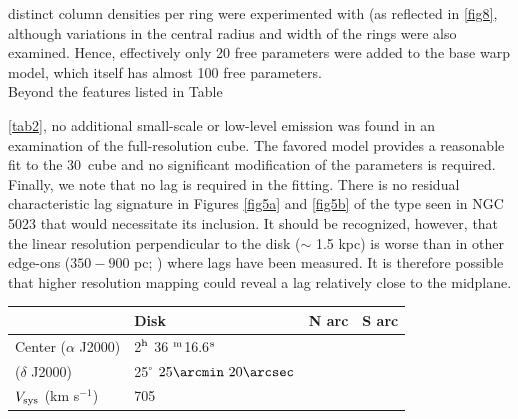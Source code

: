 \documentclass[useAMS,usenatbib]{mn2e}
\begin{document}
distinct column densities per ring were experimented with (as reflected in
\ref{fig8}, although variations in the central radius and width of the rings were also examined.  Hence, effectively only 20 free parameters were added to the base warp model, which itself has almost 100 free parameters.\\
\indent Beyond the features listed in Table {\ref{tab2}, no additional small-scale or low-level emission was found in an
examination of the full-resolution cube.  The favored model provides a
reasonable fit to the 30\arcsec\ cube and no significant modification of the
parameters is required.\\
\indent Finally, we note that no lag is required in the fitting.  There
is no residual characteristic lag signature in Figures \ref{fig5a} and 
\ref{fig5b} of the type seen in NGC 5023 that would necessitate its inclusion.
It should be recognized, however, that the linear resolution perpendicular to the disk ($\sim$ 1.5 kpc) is worse than in other edge-ons ($350-900$ pc; \citet{Oosterloo2007,Kamphuis2011,Zschaechner2011,Zschaechner2012}) where lags have been measured.  It is therefore possible that higher resolution mapping could reveal a lag relatively close to the midplane.\\
 \begin{table}
    \centering
    \begin{tabular}{@{} llll @{}} %
       \hline
       \hline
& Disk & N arc  & S arc \\
       \hline
Center ($\alpha$ J2000) & 2$^{{\rm h}}$  36 $^{{\rm m}}$16.6$^{{\rm s}}$ & & \\
	 \hspace*{0.93cm}($\delta$ J2000) & 25$^{\circ}$ $25\arcmin\ 20\arcsec$ & &\\	
$V_{\rm sys}$ (km s$^{-1}$)&705& &\\


\end{tabular}
\end{table}}
\end{document}
